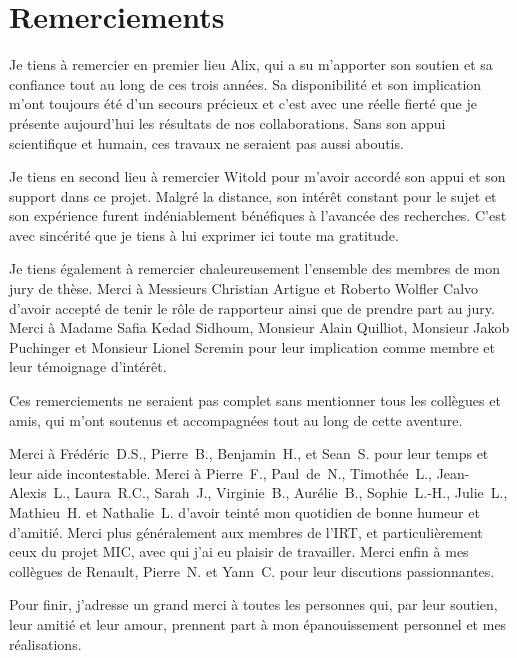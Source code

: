 \chapter*{Remerciements}

Je tiens à remercier en premier lieu Alix, qui a su m'apporter son soutien et sa confiance tout au long de ces trois années.
Sa disponibilité et son implication m'ont toujours été d'un secours précieux et c'est avec une réelle fierté que je présente aujourd'hui les résultats de nos collaborations.
Sans son appui scientifique et humain, ces travaux ne seraient pas aussi aboutis.

\medskip
Je tiens en second lieu à remercier Witold pour m'avoir accordé son appui et son support dans ce projet.
Malgré la distance, son intérêt constant pour le sujet et son expérience furent indéniablement bénéfiques à l'avancée des recherches.
C'est avec sincérité que je tiens à lui exprimer ici toute ma gratitude.

\medskip
Je tiens également à remercier chaleureusement l'ensemble des membres de mon jury de thèse.
Merci à Messieurs Christian Artigue et Roberto Wolfler Calvo d'avoir accepté de tenir le rôle de rapporteur ainsi que de prendre part au jury.
Merci à Madame Safia Kedad Sidhoum, Monsieur Alain Quilliot, Monsieur Jakob Puchinger et Monsieur Lionel Scremin pour leur implication comme membre et leur témoignage d'intérêt.

\medskip
Ces remerciements ne seraient pas complet sans mentionner tous les collègues et amis, qui m'ont soutenus et accompagnées tout au long de cette aventure.

Merci à \mbox{Frédéric D.S.}, \mbox{Pierre B.}, \mbox{Benjamin H.}, et \mbox{Sean S.} pour leur temps et leur aide incontestable.
Merci à \mbox{Pierre F.}, \mbox{Paul de N.}, \mbox{Timothée L.}, \mbox{Jean-Alexis L.}, \mbox{Laura R.C.}, \mbox{Sarah J.}, \mbox{Virginie B.}, \mbox{Aurélie B.}, \mbox{Sophie L.-H.}, \mbox{Julie L.}, \mbox{Mathieu H.} et \mbox{Nathalie L.} d'avoir teinté mon quotidien de bonne humeur et d'amitié.
Merci plus généralement aux membres de l'IRT, et particulièrement ceux du projet MIC, avec qui j'ai eu plaisir de travailler.
Merci enfin à mes collègues de Renault, \mbox{Pierre N.} et \mbox{Yann C.} pour leur discutions passionnantes.

\medskip
Pour finir, j'adresse un grand merci à toutes les personnes qui, par leur soutien, leur amitié et leur amour, prennent part à mon épanouissement personnel et mes réalisations.
